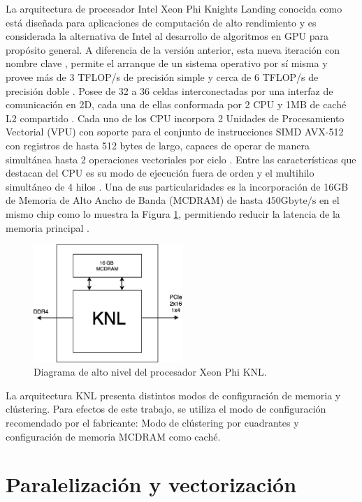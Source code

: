 La arquitectura de procesador Intel Xeon Phi Knights Landing conocida como  está dise\~nada para aplicaciones de computación de alto rendimiento y es considerada la alternativa de Intel al desarrollo de algoritmos en GPU para propósito general. A diferencia de la versión anterior, esta nueva iteración con nombre clave , permite el arranque de un sistema operativo por sí misma y provee más de 3 TFLOP/s de precisión simple y cerca de 6 TFLOP/s de precisión doble \cite{Jeffers201663}. Posee de 32 a 36 celdas interconectadas por una interfaz de comunicación en 2D, cada una de ellas conformada por 2 CPU y 1MB de caché L2 compartido \cite{XeonPhiWhitePaper}. Cada uno de los CPU incorpora 2 Unidades de Procesamiento Vectorial (VPU) con soporte para el conjunto de instrucciones SIMD AVX-512 con registros de hasta 512 bytes de largo, capaces de operar de manera simult\'anea hasta 2 operaciones vectoriales por ciclo \cite{XeonPhiWhitePaper}. 
Entre las características que destacan del CPU es su modo de ejecución fuera de orden y el multihilo simultáneo de 4 hilos \cite{XeonPhiWhitePaper}. Una de sus particularidades es la incorporación de 16GB de Memoria de Alto Ancho de Banda (MCDRAM) de hasta $450 \text{Gbyte/s}$ en el mismo chip como lo muestra la Figura \ref{fig:cpu_phi}, permitiendo reducir la latencia de la memoria principal \cite{XeonPhiWhitePaper}.

\begin{figure}
\centering
\includegraphics[width=0.5\textwidth]{fig/cpu}
\caption{Diagrama de alto nivel del procesador Xeon Phi KNL.}
\label{fig:cpu_phi}
\end{figure}


La arquitectura KNL presenta distintos modos de configuración de memoria y clústering. Para efectos de este trabajo, se utiliza el modo de configuración recomendado por el fabricante: Modo de cl\'ustering por cuadrantes y configuración de memoria MCDRAM como caché.


\section{Paralelización y vectorización}
\label{ch:marco_parallel}

